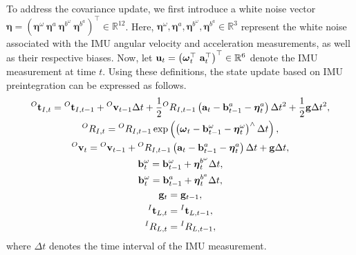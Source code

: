 To address the covariance update, we first introduce a white noise vector $\boldsymbol \eta = \left( \boldsymbol \eta^{\omega} ~ \boldsymbol \eta^{a} ~ \boldsymbol \eta^{ b^{\omega} } ~ \boldsymbol \eta^{ b^{a} } \right)^{\top} \in \mathbb{R}^{12}$.
Here, $\boldsymbol \eta^{\omega}, \boldsymbol \eta^{a}, \boldsymbol \eta^{ b^{\omega} }, \boldsymbol \eta^{ b^{a} } \in \mathbb{R}^{3}$ represent the white noise associated with the IMU angular velocity and acceleration measurements, as well as their respective biases.
Now, let ${\bf u}_{t} = \left( \boldsymbol \omega_{t}^{\top} ~ {\bf a}_{t}^{\top} \right)^{\top} \in \mathbb{R}^{6}$ denote the IMU measurement at time $t$.
Using these definitions, the state update based on IMU preintegration can be expressed as follows.
%
\begin{align}
  \begin{gathered}
    {}^{O}{\bf t}_{I, t} = {}^{O}{\bf t}_{I, t-1} + {}^{O}{\bf v}_{t-1} \Delta t + \frac{1}{2} {}^{O}R_{I, t-1} \left( {\bf a}_{t} - {\bf b}_{t-1}^{a} - \boldsymbol \eta_{t}^{a} \right)\Delta t^{2} + \frac{1}{2} {\bf g} \Delta t^{2}, \\
%
    {}^{O}R_{I, t} = {}^{O}R_{I, t-1} \exp \left( \left( \boldsymbol \omega_{t} - {\bf b}_{t-1}^{\omega} - \boldsymbol \eta_{t}^{\omega} \right)^{\wedge} \Delta t \right), \\
%
    {}^{O}{\bf v}_{t} = {}^{O}{\bf v}_{t-1} + {}^{O}R_{I, t-1} \left( {\bf a}_{t} - {\bf b}_{t-1}^{a} - \boldsymbol \eta_{t}^{a} \right) \Delta t + {\bf g} \Delta t, \\
%
    {\bf b}_{t}^{\omega} = {\bf b}_{t-1}^{\omega} + \boldsymbol \eta_{t}^{ b^{\omega} } \Delta t, \\
%
    {\bf b}_{t}^{\omega} = {\bf b}_{t-1}^{a} + \boldsymbol \eta_{t}^{ b^{a} } \Delta t, \\
%
    {\bf g}_{t} = {\bf g}_{t-1}, \\
%
    {}^{I}{\bf t}_{L, t} = {}^{I}{\bf t}_{L, t-1}, \\
%
    {}^{I}R_{L, t} = {}^{I}R_{L, t-1},
  \end{gathered}
  \label{eq:discrete_imu_preintegration_tight}
\end{align}
%
where $\Delta t$ denotes the time interval of the IMU measurement.

